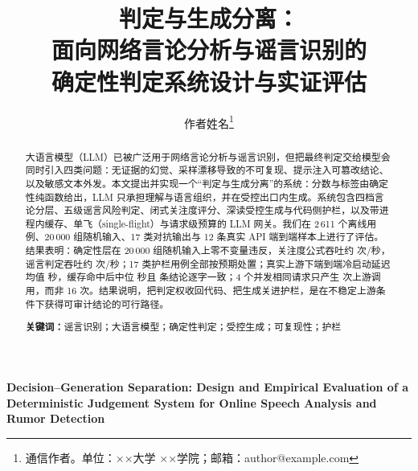 \documentclass[12pt,a4paper,fontset=windows]{ctexart}
\title{\zihao{2}\bfseries 判定与生成分离：\\面向网络言论分析与谣言识别的\\确定性判定系统设计与实证评估}
\author{作者姓名\thanks{通信作者。单位：××大学 ××学院；邮箱：author@example.com}}
\date{\PaperDate}
\begin{document}
\maketitle

\begin{abstract}
大语言模型（LLM）已被广泛用于网络言论分析与谣言识别，但把最终判定交给模型会同时引入四类问题：无证据的幻觉、采样漂移导致的不可复现、提示注入可篡改结论、以及敏感文本外发。本文提出并实现一个“判定与生成分离”的系统：分数与标签由确定性纯函数给出，LLM 只承担理解与语言组织，并在受控出口内生成。系统包含四档言论分层、五级谣言风险判定、闭式关注度评分、深读受控生成与代码侧护栏，以及带进程内缓存、单飞（single-flight）与请求级预算的 LLM 网关。我们在 2\,611 个离线用例、20\,000 组随机输入、17 类对抗输出与 12 条真实 API 端到端样本上进行了评估。结果表明：确定性层在 20\,000 组随机输入上零不变量违反，关注度公式吞吐约 \AttnThroughput{} 次/秒，谣言判定吞吐约 \VerdictThroughput{} 次/秒；17 类护栏用例全部按预期处置；真实上游下端到端冷启动延迟均值 \ApiColdMean{} 秒，缓存命中后中位 \ApiWarmMedian{} 秒且 \ApiIdentical{} 条结论逐字一致；4 个并发相同请求只产生 \ApiConcRequests{} 次上游调用，而非 16 次。结果说明，把判定权收回代码、把生成关进护栏，是在不稳定上游条件下获得可审计结论的可行路径。

\vspace{0.6em}
\noindent\textbf{关键词：}谣言识别；大语言模型；确定性判定；受控生成；可复现性；护栏
\end{abstract}

\newpage
\begin{center}
\textbf{\large Decision--Generation Separation: Design and Empirical Evaluation of a Deterministic Judgement System for Online Speech Analysis and Rumor Detection}
\end{center}
\end{document}
